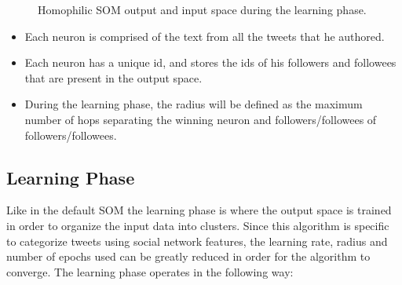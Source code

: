 \begin{figure}[htpb]
  \label{fig:homo_in_out}
  \caption{ Homophilic SOM output and input space during the learning phase. }
\end{figure}
\begin{itemize}
  \item Each neuron is comprised of the text from all the tweets that he authored.
  \item Each neuron has a unique id, and stores the ids of his followers and followees that are present in the output space.
  \item During the learning phase, the radius will be defined as the maximum number of hops separating the winning neuron and followers/followees of followers/followees. 
\end{itemize}


\subsection{Learning Phase}
\label{sub:learning_phase}
Like in the default \ac{SOM} the learning phase is where the output space is trained in order to organize the input data into clusters. Since this algorithm is specific to categorize tweets using social network features, the learning rate, radius and number of epochs used can be greatly reduced in order for the algorithm to converge. The learning phase operates in the following way:

